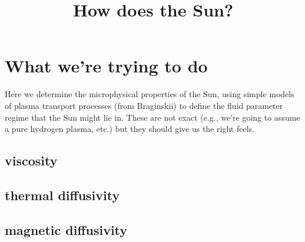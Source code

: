 \documentclass[twocolumn]{aastex62}
\begin{document}
\title{How does the Sun?}

\section{What we're trying to do}
Here we determine the microphysical properties of the Sun, using simple models of plasma transport processes (from Braginskii) to define the fluid parameter regime that the Sun might lie in.  These are not exact (e.g., we're going to assume a pure hydrogen plasma, etc.) but they should give us the right feels.

\subsection{viscosity}

\subsection{thermal diffusivity}

\subsection{magnetic diffusivity}
\end{document}
